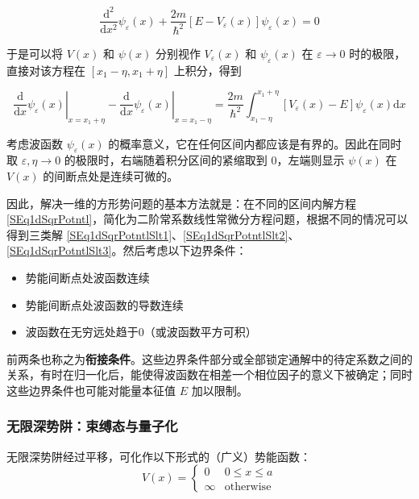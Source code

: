 \documentclass[cn,10pt,math=newtx,citestyle=gb7714-2015,bibstyle=gb7714-2015]{elegantbook}
\def\d{\mathrm d}
\def\ra{\rightarrow}
\begin{document}
\begin{equation}
    \frac{\d^2}{\d x^2}\psi_\varepsilon(x)+\frac{2m}{\hbar^2}[E-V_\varepsilon(x)]\psi_\varepsilon(x)=0
\end{equation}

于是可以将 $V(x)$ 和 $\psi(x)$ 分别视作 $V_\varepsilon(x)$ 和 $\psi_\varepsilon(x)$ 在 $\varepsilon\rightarrow 0$ 时的极限，直接对该方程在 $[x_1-\eta,x_1+\eta]$ 上积分，得到

\begin{equation}
    \left.\frac{\d}{\d x}\psi_\varepsilon(x)\right|_{x=x_1+\eta}-\left.\frac{\d}{\d x}\psi_\varepsilon(x)\right|_{x=x_1-\eta}=\frac{2m}{\hbar^2}\int_{x_1-\eta}^{x_1+\eta}[V_\varepsilon(x)-E]\psi_\varepsilon(x)\d x
\end{equation}

考虑波函数 $\psi_\varepsilon(x)$ 的概率意义，它在任何区间内都应该是有界的。因此在同时取 $\varepsilon,\eta\ra 0$ 的极限时，右端随着积分区间的紧缩取到 $0$，左端则显示 $\psi(x)$ 在 $V(x)$ 的间断点处是连续可微的。

因此，解决一维的方形势问题的基本方法就是：在不同的区间内解方程 \ref{SEq1dSqrPotntl}，简化为二阶常系数线性常微分方程问题，根据不同的情况可以得到三类解 \ref{SEq1dSqrPotntlSlt1}、\ref{SEq1dSqrPotntlSlt2}、\ref{SEq1dSqrPotntlSlt3}。然后考虑以下边界条件：
\begin{itemize}
    \item 势能间断点处波函数连续
    \item 势能间断点处波函数的导数连续
    \item 波函数在无穷远处趋于0（或波函数平方可积）
\end{itemize}

前两条也称之为\textbf{衔接条件}。这些边界条件部分或全部锁定通解中的待定系数之间的关系，有时在归一化后，能使得波函数在相差一个相位因子的意义下被确定；同时这些边界条件也可能对能量本征值 $E$ 加以限制。

\subsubsection{无限深势阱：束缚态与量子化}
无限深势阱经过平移，可化作以下形式的（广义）势能函数：
\begin{equation}
    V(x)=\begin{cases}
        0 & 0\le x\le a\\
        \infty & \text{otherwise}
    \end{cases}
\end{equation}
\end{document}
